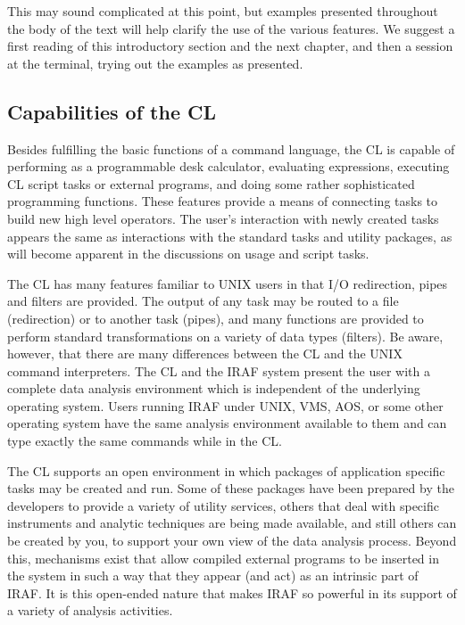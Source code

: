 This may sound complicated at this point, but examples
presented throughout the body of the text will help
clarify the use of the various features.  We suggest a first reading of
this introductory section and the next chapter, and then a session at
the terminal, trying out the examples as presented.

\subsection{Capabilities of the CL}

\ppind
Besides fulfilling the basic functions of a command language,
the CL is capable of performing as a programmable desk
calculator, evaluating expressions, executing CL script tasks
or external programs, and doing some rather sophisticated
programming functions. These features provide 
a means of connecting tasks to build new high level operators.
The user's interaction with newly created tasks appears the same as 
interactions with the standard tasks and utility packages,
as will become apparent in the discussions on usage and script tasks.

The CL has many features familiar to UNIX users in that
I/O redirection, pipes and filters are provided.
The output of any task may be routed to a file (redirection)
or to another task (pipes), and many functions are provided to
perform standard transformations on a variety of data types (filters).
Be aware, however, that there are many differences between the CL
and the UNIX command interpreters.  
The CL and the IRAF system present the user with a
complete data analysis environment which is independent of the underlying 
operating system.  Users running IRAF under UNIX, VMS, AOS, or some
other operating system have the same analysis environment available
to them and can type exactly the same commands while in the CL.

The CL supports an open environment in which packages of application
specific tasks may be created and run.  Some of these packages
have been prepared by the developers to provide a variety of utility
services, others that deal with specific instruments and analytic 
techniques are being made available, 
and still others can be created by you, to support your
own view of the data analysis process.  Beyond this, mechanisms exist
that allow compiled external programs to be inserted in the system in 
such a way that they appear (and act) as an intrinsic part of IRAF.
It is this open-ended nature that makes IRAF so powerful in its
support of a variety of analysis activities.

